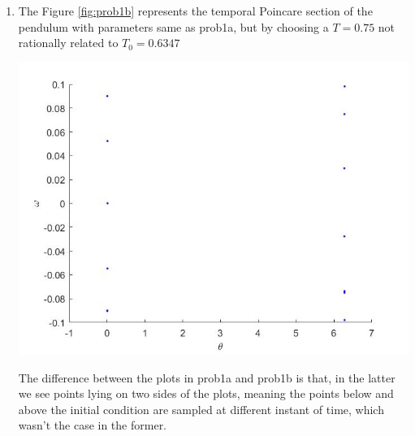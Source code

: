 \documentclass{article}
\begin{document}
\begin{enumerate}[label=(\alph*)]
\item
The Figure \ref{fig:prob1b} represents the temporal Poincare section of the pendulum with parameters same as prob1a, but by choosing a $T = 0.75$ not rationally related to $T_{0} = 0.6347$ \par\medskip
\begin{minipage}{\linewidth}
{
\centering 
\includegraphics[scale=0.4]{images/prob1b.jpg}
\label{fig:prob1b}
}
\end{minipage}
\par\medskip

The difference between the plots in prob1a and prob1b is that, in the latter we see points lying on two sides of the plots, meaning the points below and above the initial condition are sampled at different instant of time, which wasn't the case in the former.


\end{enumerate}
\end{document}
